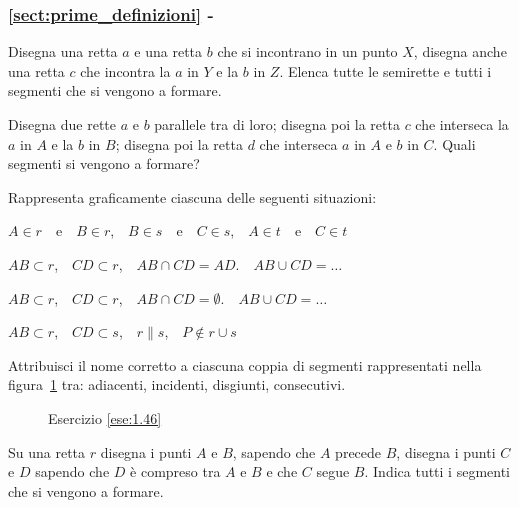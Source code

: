 \begingroup
\hypersetup{linkcolor=black}
\subsubsection*{\ref{sect:prime_definizioni} - }
\endgroup

\begin{esercizio}
\label{ese:1.43}
Disegna una retta $a$ e una retta $b$ che si incontrano in un punto $X$, disegna anche una retta $c$ che incontra la $a$ in $Y$ e la $b$ in $Z$. Elenca tutte le semirette e tutti i segmenti che si vengono a formare.
\end{esercizio}

\begin{esercizio}
\label{ese:1.44}
Disegna due rette $a$ e $b$ parallele tra di loro; disegna poi la retta $c$ che interseca la $a$ in $A$ e la $b$ in $B$; disegna poi la retta $d$ che interseca $a$ in $A$ e $b$ in $C$. Quali segmenti si vengono a formare?
\end{esercizio}

\begin{esercizio}
\label{ese:1.45}
Rappresenta graficamente ciascuna delle seguenti situazioni:
\begin{enumeratea}
\item $A\in r$~~e~~$B\in r$,~~$B\in s$~~e~~$C\in s$,~~$A\in t$~~e~~$C\in t$
\item $AB\subset r$,~~$CD\subset r$,~~$AB\cap CD=AD$.~~$AB\cup CD=\ldots{}$
\item $AB\subset r$,~~$CD\subset r$,~~$AB\cap CD=\emptyset$.~~$AB\cup CD=\ldots{}$
\item $AB\subset r$,~~$CD\subset s$,~~$r\parallel s$,~~$P\notin r\cup s$
\end{enumeratea}
\end{esercizio}

\begin{esercizio}
\label{ese:1.46}
Attribuisci il nome corretto a ciascuna coppia di segmenti rappresentati nella figura~\ref{fig:ese1.46} tra: adiacenti, incidenti, disgiunti, consecutivi.
\end{esercizio}

\begin{figure}[htb]
 \centering
 \caption{Esercizio \ref{ese:1.46}}\label{fig:ese1.46}
\end{figure}

\begin{esercizio}
\label{ese:1.47}
Su una retta $r$ disegna i punti $A$ e $B$, sapendo che $A$ precede $B$, disegna i punti $C$ e $D$ sapendo che $D$ è compreso tra $A$ e $B$ e che $C$ segue $B$. Indica tutti i segmenti che si vengono a formare.
\end{esercizio}

